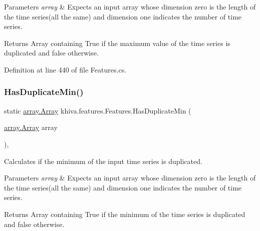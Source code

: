 \begin{DoxyParams}{Parameters}
{\em array} & Expects an input array whose dimension zero is the length of the time series(all the same) and dimension one indicates the number of time series.\\
\hline
\end{DoxyParams}
\begin{DoxyReturn}{Returns}
Array containing True if the maximum value of the time series is duplicated and false otherwise.
\end{DoxyReturn}


Definition at line 440 of file Features.\+cs.

\mbox{\label{classkhiva_1_1features_1_1_features_a1c89f58b3851d06f57635ef4abbb0293}} 
\subsubsection{\texorpdfstring{Has\+Duplicate\+Min()}{HasDuplicateMin()}}
{\footnotesize\ttfamily static \mbox{\hyperlink{classkhiva_1_1array_1_1_array}{array.\+Array}} khiva.\+features.\+Features.\+Has\+Duplicate\+Min (\begin{DoxyParamCaption}\item[{\mbox{\hyperlink{classkhiva_1_1array_1_1_array}{array.\+Array}}}]{array }\end{DoxyParamCaption})\hspace{0.3cm}{\ttfamily [inline]}, {\ttfamily [static]}}



Calculates if the minimum of the input time series is duplicated. 


\begin{DoxyParams}{Parameters}
{\em array} & Expects an input array whose dimension zero is the length of the time series(all the same) and dimension one indicates the number of time series.\\
\hline
\end{DoxyParams}
\begin{DoxyReturn}{Returns}
Array containing True if the minimum of the time series is duplicated and false otherwise.
\end{DoxyReturn}


